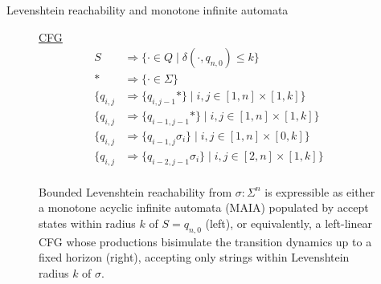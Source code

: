 \documentclass{beamer}
\begin{document}
\begin{frame}[fragile]{Levenshtein reachability and monotone infinite automata}
\begin{figure}[H]
\begin{minipage}[c]{0.5\textwidth}
{
}
\end{minipage}
\hfill
\begin{minipage}[l]{5 cm}
\centering
\underline{CFG}\vspace{14.5pt}
{\footnotesize
\begin{align*}
S &\Rightarrow \{\cdot \in Q \mid \delta(\cdot, q_{n,0}) \leq k\}\\
* &\Rightarrow \{\cdot \in \Sigma\}\\
\big\{q_{i, j} &\Rightarrow \{q_{i, j-1}*\} \mid i, j \in [1, n]\times[1, k]\big\}\\
\big\{q_{i, j} &\Rightarrow \{q_{i-1, j-1}*\}\mid i, j\in[1, n]\times [1, k]\big\}\\
\big\{q_{i, j} &\Rightarrow \{q_{i-1, j} \sigma_i \}\mid i, j \in [1, n]\times[0, k]\big\} \\
\big\{q_{i, j} &\Rightarrow \{q_{i-2, j-1} \sigma_i\} \mid i, j \in [2, n]\times[1, k] \big\}\\
\end{align*}
}%
\end{minipage}
\caption{Bounded Levenshtein reachability from $\sigma: \Sigma^n$ is expressible as either a monotone acyclic infinite automata (MAIA) populated by accept states within radius $k$ of $S=q_{n,0}$ (left), or equivalently, a left-linear CFG whose productions bisimulate the transition dynamics up to a fixed horizon (right), accepting only strings within Levenshtein radius $k$ of $\sigma$.}
\end{figure}
\end{frame}
\end{document}
